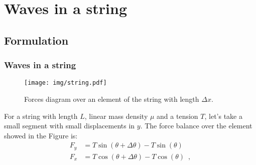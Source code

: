 \documentclass{beamer}
\begin{document}
\section{Waves in a string}
\subsection{Formulation}
\begin{frame}\frametitle{Waves in a string}
	
\transwipe
	
\begin{figure}[h]
	\centering
	\texttt{[image: img/string.pdf]}
	\caption{Forces diagram over an element of the string with length $\Delta x$. }
\end{figure}

 {For a string with length $L$, linear mass density $\mu$ and a tension $T$, let's take a small segment with small displacements in $y$. The force balance over the element showed in the Figure is:
\begin{align*}
F_y &= T \sin(\theta + \Delta \theta) - T \sin(\theta)\\
F_x &= T \cos(\theta + \Delta \theta) - T \cos(\theta) \enspace ,
\end{align*}}

\end{frame}
\end{document}
